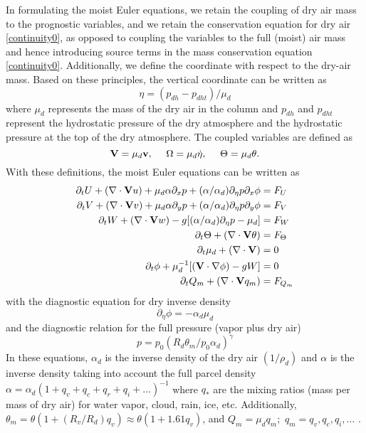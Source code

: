 In formulating the moist Euler equations, we retain the coupling
of dry air mass to the prognostic variables, and we retain the
conservation equation for dry air \eqref{continuity0}, as opposed to
coupling the variables to the full (moist) air mass and hence
introducing source terms in the mass conservation equation
\eqref{continuity0}.  Additionally, we define the coordinate with
respect to the dry-air mass. Based on these principles, the vertical
coordinate can be written as
%
\begin{equation}
\eta = (p_{dh}-p_{dht})/\mu_d 
\label{eta_def1}
\end{equation}
%
\noindent
where $\mu_d$ represents the mass of the dry air in the column and
$p_{dh}$ and $p_{dht}$ represent the hydrostatic pressure of the dry
atmosphere and the hydrostatic pressure at the top of the dry atmosphere.
The coupled variables are defined as 
%
\begin{equation}
 \hbox{\bf V} = \mu_d \hbox{\bf  v}, ~~~~ \Omega = \mu_d\dot\eta, ~~~~ 
     \Theta = \mu_d \theta.                                      
\end{equation}
%
With these definitions, the moist Euler equations can be written as
%
\begin{align}
\partial_t U + (\nabla \cdot {\bf V}  u)
+ \mu_d \alpha \partial_x p 
+ (\alpha/\alpha_d) \partial_\eta p \partial_x \phi & = F_U \\
%
\partial_t V + (\nabla \cdot {\bf V} v ) 
+ \mu_d \alpha \partial_y p
+ (\alpha/\alpha_d) \partial_\eta p \partial_y \phi & = F_V \\
%
\partial_t W + (\nabla \cdot {\bf V} w )  
- g [ (\alpha/\alpha_d) \partial_\eta p - \mu_d ] & = F_W \\
%
\partial_t \Theta + (\nabla \cdot {\bf V} \theta )  & = F_\Theta \\
%
\partial_t \mu_d + (\nabla \cdot {\bf V} ) & = 0 \\
%
\partial_t \phi + \mu_d^{-1} [({\bf V} \cdot \nabla \phi ) - gW ] & = 0\\
%
\partial_t Q_m + (\nabla \cdot {\bf V} q_m ) & = F_{Q_m} 
%
\end{align}
\noindent
with the diagnostic equation for dry inverse density
%
\begin{equation}
\partial_\eta \phi  = - \alpha_d \mu_d
\end{equation}
%
\noindent
and the diagnostic relation for the 
full pressure (vapor plus dry air)
%
\begin{equation}
p = p_0 (R_d \theta_m / p_0 \alpha_d)^{\gamma}
\label{ideal_gas_law}
\end{equation}
%
\noindent
In these equations, $\alpha_d$ is the inverse density of the dry air
$(1/\rho_d)$ and $\alpha$ is the inverse density taking into account the
full parcel density 
$\alpha = \alpha_d ( 1 + q_v + q_c + q_r + q_i + ...)^{-1}$ where
$q_*$ are the mixing ratios (mass per mass of dry air) for water vapor,
cloud, rain, ice, etc.  
Additionally, $\theta_m = \theta (1 + (R_v/R_d) q_v) 
\approx \theta (1 + 1.61 q_v)$, and $Q_m = \mu_d q_m; \,\, q_m = q_v, q_c,
q_i, ...$ .


